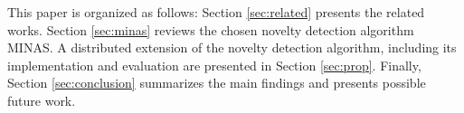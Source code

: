 This paper is organized as follows:
Section \ref{sec:related} presents the related works.
Section \ref{sec:minas} reviews the chosen novelty detection algorithm MINAS.
A distributed extension of the novelty detection algorithm, including its
implementation and evaluation are presented in Section \ref{sec:prop}.
Finally, Section \ref{sec:conclusion} summarizes the main findings and presents
possible future work.








